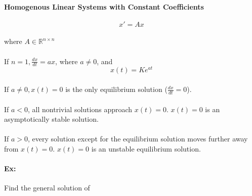 \documentclass[letterpaper,12pt]{article}
\begin{document}
\paragraph{Homogenous Linear Systems with Constant Coefficients}
\[
    x' = Ax
\]
\paragraph{}where $A\in \mathbb{R}^{n\times n}$
\paragraph{}If $n=1, \frac{dx}{dt} = ax$, where $a \ne 0$, and
\[
    x(t) = K e^{at}
\]
\paragraph{}If $a \ne 0, x(t) = 0$ is the only equilibrium solution ($\frac{dx}{dt} = 0$).
\paragraph{}If $a < 0$, all nontrivial solutions approach $x(t) = 0$. $x(t) = 0$ is an
asymptotically stable solution.

\paragraph{}If $a > 0$, every solution except for the equilibrium solution moves further 
away from $x(t) = 0$. $x(t) = 0$ is an unstable equilibrium solution.

\paragraph{Ex:} Find the general solution of
\end{document}
